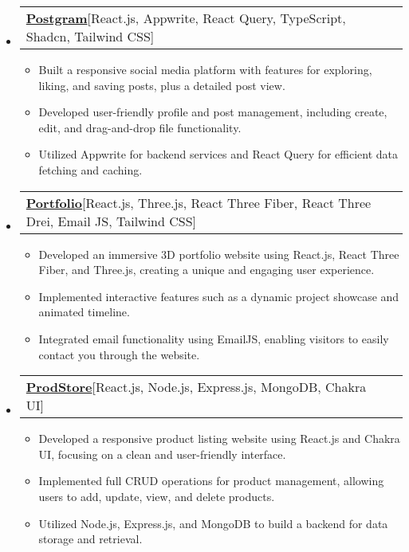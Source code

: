 \documentclass[letterpaper,11pt]{article}
\makeatletter
\newcommand{\resumeItem}[1]{
  \item\small{
    {#1 \vspace{-2pt}}
  }
}
\newcommand{\resumeProjectHeading}[2]{
    \item
    \begin{tabular*}{0.97\textwidth}{l@{\extracolsep{\fill}}r}
      \small#1 & #2 \\
    \end{tabular*}\vspace{-5pt}
}
\newcommand{\resumeSubHeadingListStart}{\begin{itemize}[leftmargin=0.15in, label={}]}
\newcommand{\resumeSubHeadingListEnd}{\end{itemize}}
\newcommand{\resumeItemListStart}{\begin{itemize}}
\newcommand{\resumeItemListEnd}{\end{itemize}}
\makeatother
\begin{document}
\resumeSubHeadingListStart
\resumeProjectHeading
{\textbf{\href{https://github.com/ayush2004patel/social_media_app}{Postgram}\hspace{5pt}}{{[React.js, Appwrite, React Query, TypeScript, Shadcn, Tailwind CSS]}}}{}
\resumeItemListStart
\resumeItem{Built a responsive social media platform with features for exploring, liking, and saving posts, plus a detailed post view.}
\resumeItem{Developed user-friendly profile and post management, including create, edit, and drag-and-drop file functionality.}
\resumeItem{Utilized Appwrite for backend services and React Query for efficient data fetching and caching.}
\resumeItemListEnd
\resumeSubHeadingListEnd

\resumeSubHeadingListStart
\resumeProjectHeading
{\textbf{\href{https://github.com/ayush2004patel/Portfolio-v2}{Portfolio}\hspace{5pt}}{{[React.js, Three.js, React Three Fiber, React Three Drei, Email JS, Tailwind CSS]}}}{}
\resumeItemListStart
\resumeItem{Developed an immersive 3D portfolio website using React.js, React Three Fiber, and Three.js, creating a unique and engaging user experience.}
\resumeItem{Implemented interactive features such as a dynamic project showcase and animated timeline.}
\resumeItem{Integrated email functionality using EmailJS, enabling visitors to easily contact you through the website.}
\resumeItemListEnd
\resumeSubHeadingListEnd

\resumeSubHeadingListStart
\resumeProjectHeading
{\textbf{\href{https://github.com/ayush2004patel/prod-store}{ProdStore}\hspace{5pt}}{{[React.js, Node.js, Express.js, MongoDB, Chakra UI]}}}{}
\resumeItemListStart
\resumeItem{Developed a responsive product listing website using React.js and Chakra UI, focusing on a clean and user-friendly interface.}
\resumeItem{Implemented full CRUD operations for product management, allowing users to add, update, view, and delete products.}
\resumeItem{Utilized Node.js, Express.js, and MongoDB to build a backend for data storage and retrieval.}
\resumeItemListEnd
\resumeSubHeadingListEnd


\end{document}
